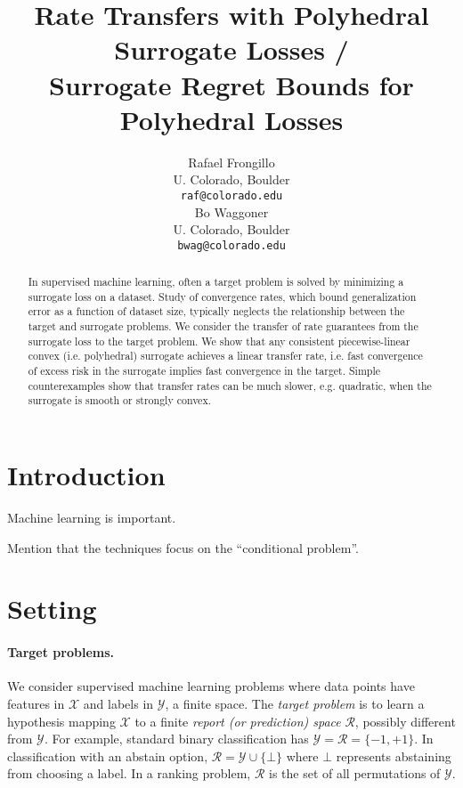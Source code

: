 \documentclass{article}
\title{Rate Transfers with Polyhedral Surrogate Losses /\\
  Surrogate Regret Bounds for Polyhedral Losses}
\author{%
  Rafael Frongillo \\
  U. Colorado, Boulder \\
  \texttt{raf@colorado.edu} \\
  \And
  Bo Waggoner \\
  U. Colorado, Boulder \\
  \texttt{bwag@colorado.edu}
}
\newcommand{\R}{\mathcal{R}}
\newcommand{\X}{\mathcal{X}}
\newcommand{\Y}{\mathcal{Y}}
\begin{document}
\maketitle

\begin{abstract}
  In supervised machine learning, often a target problem is solved by minimizing a surrogate loss on a dataset.
  Study of convergence rates, which bound generalization error as a function of dataset size, typically neglects the relationship between the target and surrogate problems.
  We consider the transfer of rate guarantees from the surrogate loss to the target problem.
  We show that any consistent piecewise-linear convex (i.e. polyhedral) surrogate achieves a linear transfer rate, i.e. fast convergence of excess risk in the surrogate implies fast convergence in the target.
  Simple counterexamples show that transfer rates can be much slower, e.g. quadratic, when the surrogate is smooth or strongly convex.
\end{abstract}



\section{Introduction}

Machine learning is important.

Mention that the techniques focus on the ``conditional problem''.


\section{Setting}

\paragraph{Target problems.}
We consider supervised machine learning problems where data points have features in $\X$ and labels in $\Y$, a finite space.
The \emph{target problem} is to learn a hypothesis mapping $\X$ to a finite \emph{report (or prediction) space} $\R$, possibly different from $\Y$.
For example, standard binary classification has $\Y = \R = \{-1,+1\}$.
In classification with an abstain option, $\R = \Y \cup \{\bot\}$ where $\bot$ represents abstaining from choosing a label.
In a ranking problem, $\R$ is the set of all permutations of $\Y$.
\end{document}
